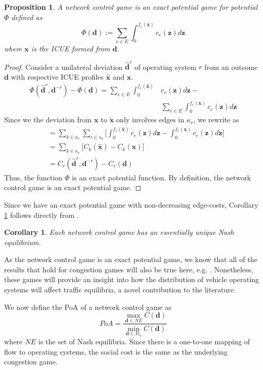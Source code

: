 \documentclass{article}
\newtheorem{prop}{Proposition}
\newtheorem{cor}{Corollary}
\begin{document}
    \begin{prop}
    A network control game is an exact potential game for potential $\Phi$ defined as 
    \[ \Phi(\bm{d}) := \sum_{e \in E} \int_0^{f_e(\bm{x})} c_e(\bm{z})d\bm{z} \]
    where $\bm{x}$ is the ICUE formed from $\bm{d}$. 
    \end{prop}
    \begin{proof}
		Consider a unilateral deviation $\hat{\bm{d}}^r$ of operating system $r$ from an outcome $\bm{d}$ with respective ICUE profiles $\hat{\bm{x}}$ and $\bm{x}$.
		\begin{align*}
		\Phi(\hat{\bm{d}}^r,\bm{d}^{-r}) - \Phi(\bm{d}) 
		= \sum_{e \in E} \int_0^{f_e(\hat{\bm{x}})} & c_e(\bm{z})d\bm{z} - \\
		& \sum_{e \in E}  \int_0^{f_e(\bm{x})} c_e(\bm{z})d\bm{z} 
		\end{align*}
		Since we the deviation from $\bm{x}$ to $\bm{\tilde{x}}$ only involves edges in $\kappa_r$, we rewrite as
		\begin{align*}
		&=  \sum_{k \in \kappa_r} \sum_{e \in s_k} \Big[ \int_0^{f_e(\hat{\bm{x}})} c_e(\bm{z})d\bm{z}   - \int_0^{f_e(\bm{x})} c_e(\bm{z})d\bm{z} \Big] \\ 
		&=  \sum_{k \in \kappa_r}\Big[ C_k(\hat{\bm{x}}) - C_k(\bm{x}) \Big] \\
		&= C_r(\hat{\bm{d}}^r,\bm{d}^{-r}) - C_r(\bm{d})
		\end{align*}
		Thus, the function $\Phi$ is an exact potential function. By definition, the network control game is an exact potential game.
	\end{proof}
    Since we have an exact potential game with non-decreasing edge-costs, Corollary \ref{cor:essentiallyunique} follows directly from \cite[Theorem 1]{Acemoglu}. 
    \begin{cor} \label{cor:essentiallyunique}
    Each network control game has an essentially unique Nash equilibrium. 
    \end{cor}
    
    As the network control game is an exact potential game, we know that all of the results that hold for congestion games will also be true here, e.g. \cite{Roughgarden2003,Milchtaich}. Nonetheless, these games will provide an insight into how the distribution of vehicle operating systems will affect traffic equilibria, a novel contribution to the literature. 
    
    We now define the PoA of a network control game as 
    \[ PoA = \frac{\max_{\bm{d} \in NE} C(\bm{d})}{ \min_{\bm{d} \in D_\kappa} C(\bm{d})  }  \]
    where $NE$ is the set of Nash equilibria. Since there is a one-to-one mapping of flow to operating systems, the social cost is the same as the underlying congestion game. 
    
\end{document}
